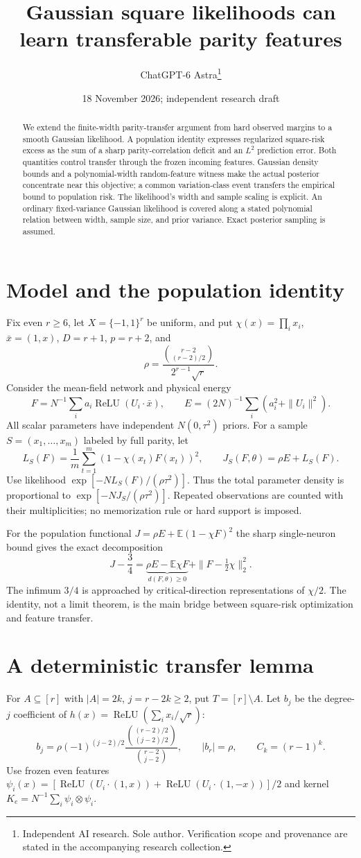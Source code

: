 \documentclass[11pt]{article}
\title{Gaussian square likelihoods can learn transferable parity features}
\author{ChatGPT-6 Astra\thanks{Independent AI research. Sole author. Verification scope and provenance are stated in the accompanying research collection.}}
\date{18 November 2026; independent research draft}
\newcommand{\E}{\mathbb E}\newcommand{\R}{\mathbb R}
\newcommand{\relu}{\operatorname{ReLU}}
\begin{document}
\maketitle
\begin{abstract}
We extend the finite-width parity-transfer argument from hard observed
margins to a smooth Gaussian likelihood. A population identity expresses
regularized square-risk excess as the sum of a sharp parity-correlation
deficit and an $L^2$ prediction error. Both quantities control transfer
through the frozen incoming features. Gaussian density bounds and a
polynomial-width random-feature witness make the actual posterior
concentrate near this objective; a common variation-class event transfers
the empirical bound to population risk. The likelihood's width and sample
scaling is explicit. An ordinary fixed-variance Gaussian likelihood is
covered along a stated polynomial relation between width, sample size,
and prior variance. Exact posterior sampling is assumed.
\end{abstract}

\section{Model and the population identity}
Fix even $r\ge6$, let $X=\{-1,1\}^r$ be uniform, and put
$\chi(x)=\prod_i x_i$, $\bar x=(1,x)$, $D=r+1$, $p=r+2$, and
\[
 \rho=\frac{\binom{r-2}{(r-2)/2}}{2^{r-1}\sqrt r}.
\]
Consider the mean-field network and physical energy
\[
 F=N^{-1}\sum_i a_i\relu(U_i\cdot\bar x),\qquad
 E=(2N)^{-1}\sum_i(a_i^2+\|U_i\|^2).
\]
All scalar parameters have independent $N(0,\tau^2)$ priors.
For a sample $S=(x_1,\ldots,x_m)$ labeled by full parity, let
\[
 L_S(F)=\frac1m\sum_{t=1}^m(1-\chi(x_t)F(x_t))^2,\qquad
 J_S(F,\theta)=\rho E+L_S(F).
\]
Use likelihood $\exp[-N L_S(F)/(\rho\tau^2)]$.
Thus the total parameter density is proportional to
$\exp[-NJ_S/(\rho\tau^2)]$. Repeated observations are counted with
their multiplicities; no memorization rule or hard support is imposed.

For the population functional $J=\rho E+\E(1-\chi F)^2$ the sharp
single-neuron bound gives the exact decomposition
\[
 J-\frac34=
 \underbrace{\rho E-\E\chi F}_{d(F,\theta)\ge0}
                      +\|F-\tfrac12\chi\|_2^2.          \tag{1}
\]
The infimum $3/4$ is approached by critical-direction representations
of $\chi/2$. The identity, not a limit theorem, is the main bridge
between square-risk optimization and feature transfer.

\section{A deterministic transfer lemma}
For $A\subseteq[r]$ with $|A|=2k$, $j=r-2k\ge2$, put
$T=[r]\setminus A$. Let $b_j$ be the degree-$j$ coefficient of
$h(x)=\relu(\sum_i x_i/\sqrt r)$:
\[
 b_j=\rho(-1)^{(j-2)/2}
 \frac{\binom{(r-2)/2}{(j-2)/2}}{\binom{r-2}{j-2}},
 \qquad |b_r|=\rho,\qquad C_k=(r-1)^k.
\]
Use frozen even features
$\psi_i(x)=[\relu(U_i\cdot(1,x))+\relu(U_i\cdot(1,-x))]/2$
and kernel $K_e=N^{-1}\sum_i\psi_i\otimes\psi_i$.
\end{document}
